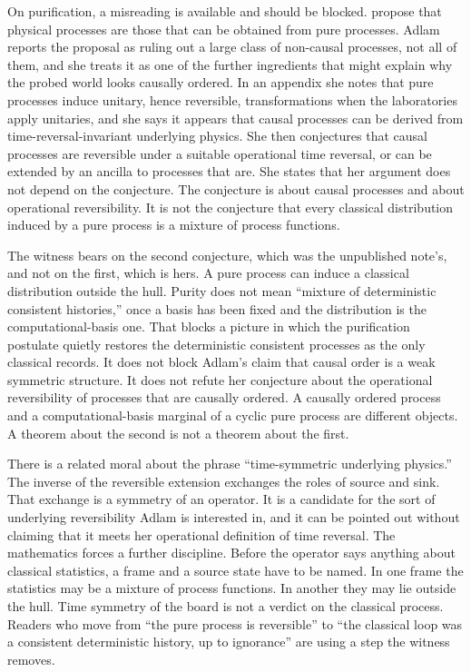 \documentclass[11pt]{article}
\begin{document}
On purification, a misreading is available and should be blocked. \citet{araujo2017} propose that physical processes are those that can be obtained from pure processes. Adlam reports the proposal as ruling out a large class of non-causal processes, not all of them, and she treats it as one of the further ingredients that might explain why the probed world looks causally ordered. In an appendix she notes that pure processes induce unitary, hence reversible, transformations when the laboratories apply unitaries, and she says it appears that causal processes can be derived from time-reversal-invariant underlying physics. She then conjectures that causal processes are reversible under a suitable operational time reversal, or can be extended by an ancilla to processes that are. She states that her argument does not depend on the conjecture. The conjecture is about causal processes and about operational reversibility. It is not the conjecture that every classical distribution induced by a pure process is a mixture of process functions.

The witness bears on the second conjecture, which was the unpublished note's, and not on the first, which is hers. A pure process can induce a classical distribution outside the hull. Purity does not mean ``mixture of deterministic consistent histories,'' once a basis has been fixed and the distribution is the computational-basis one. That blocks a picture in which the purification postulate quietly restores the deterministic consistent processes as the only classical records. It does not block Adlam's claim that causal order is a weak symmetric structure. It does not refute her conjecture about the operational reversibility of processes that are causally ordered. A causally ordered process and a computational-basis marginal of a cyclic pure process are different objects. A theorem about the second is not a theorem about the first.

There is a related moral about the phrase ``time-symmetric underlying physics.'' The inverse of the reversible extension exchanges the roles of source and sink. That exchange is a symmetry of an operator. It is a candidate for the sort of underlying reversibility Adlam is interested in, and it can be pointed out without claiming that it meets her operational definition of time reversal. The mathematics forces a further discipline. Before the operator says anything about classical statistics, a frame and a source state have to be named. In one frame the statistics may be a mixture of process functions. In another they may lie outside the hull. Time symmetry of the board is not a verdict on the classical process. Readers who move from ``the pure process is reversible'' to ``the classical loop was a consistent deterministic history, up to ignorance'' are using a step the witness removes.
\end{document}
